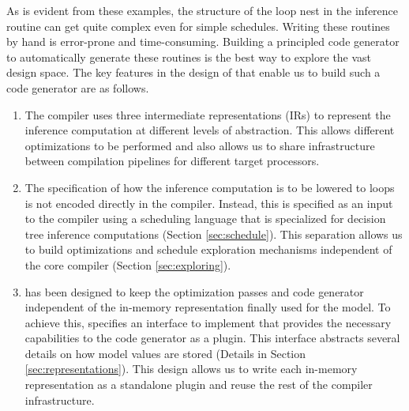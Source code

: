 As is evident from these examples, the structure of the loop 
nest in the inference routine can get quite complex even 
for simple schedules. Writing these routines by hand 
is error-prone and time-consuming. Building a principled code 
generator to automatically generate these routines is the 
best way to explore the vast design space. The key features in 
the design of \Treebeard{} that enable us to build such a code
generator are as follows.  

\begin{enumerate}
  \item The compiler uses three intermediate representations (IRs) to
  represent the inference computation at different levels of abstraction. This
  allows different optimizations to be performed and also allows us to share
  infrastructure between compilation pipelines for different target processors.

  \item The specification of how the inference computation is to be lowered to 
  loops is not encoded directly in the compiler. Instead, this 
  is specified as an input to the compiler using a scheduling language that is 
  specialized for decision tree inference computations (Section \ref{sec:schedule}).
  This separation allows us to build optimizations and schedule exploration 
  mechanisms independent of the core compiler (Section \ref{sec:exploring}). 

  \item \Treebeard{} has been designed to keep the optimization passes and code 
  generator independent of the in-memory representation finally used for the model. To achieve 
  this, \Treebeard{} specifies an interface to implement that provides the necessary 
  capabilities to the code generator as a plugin. This interface abstracts several details
  on how model values are stored (Details in Section \ref{sec:representations}). This 
  design allows us to write each in-memory representation as a standalone plugin 
  and reuse the rest of the compiler infrastructure. 
\end{enumerate}






